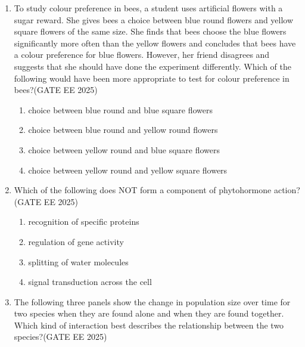 \begin{enumerate}[leftmargin=*,label=\textbf{Q.\arabic*},resume]

\item To study colour preference in bees, a student uses artificial flowers with a sugar reward. She gives bees a choice between blue round flowers and yellow square flowers of the same size. She finds that bees choose the blue flowers significantly more often than the yellow flowers and concludes that bees have a colour preference for blue flowers. However, her friend disagrees and suggests that she should have done the experiment differently. Which of the following would have been more appropriate to test for colour preference in bees?\hfill {(GATE EE 2025)}
\begin{multicols}{2}
\begin{enumerate}
\item choice between blue round and blue square flowers
\item choice between blue round and yellow round flowers
\item choice between yellow round and blue square flowers
\item choice between yellow round and yellow square flowers
\end{enumerate}
\end{multicols}

\item Which of the following does NOT form a component of phytohormone action?\hfill {(GATE EE 2025)}
\begin{multicols}{2}
\begin{enumerate}
\item recognition of specific proteins
\item regulation of gene activity
\item splitting of water molecules
\item signal transduction across the cell
\end{enumerate}
\end{multicols}

\item The following three panels show the change in population size over time for two species when they are found alone and when they are found together. Which kind of interaction best describes the relationship between the two species?\hfill {(GATE EE 2025)}


\end{enumerate}
